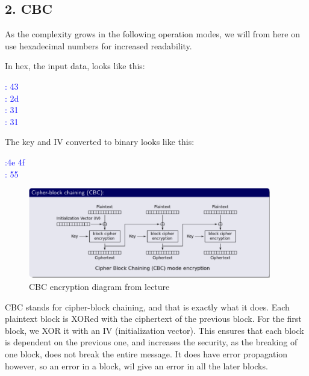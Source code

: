 \documentclass{article}
\begin{document}
\newpage
\subsection{2. CBC}

As the complexity grows in the following operation modes, we will from here on use hexadecimal numbers for increased readability.

In hex, the  input data, looks like this:
\begin{tcolorbox}
\begin{center}
\textcolor{blue}{
: 43\\
: 2d\\
: 31\\
: 31}
\end{center}
\end{tcolorbox}

The key and IV converted to binary looks like this: 
\begin{tcolorbox}
\begin{center}
\textcolor{blue}{
:\qquad4e 4f\\
: 55}
\end{center}
\end{tcolorbox}


\begin{figure}[H]
 \centering
  \includegraphics[width=300pt]{img/cbcLecture.png}
 \caption{CBC encryption diagram from lecture}
 \end{figure}

CBC stands for cipher-block chaining, and that is exactly what it does. Each plaintext block is XORed with the ciphertext of the previous block. For the first block, we XOR it with an IV (initialization vector). This ensures that each block is dependent on the previous one, and increases the security, as the breaking of one block, does not break the entire message. It does have error propagation however, so an error in a block, wil give an error in all the later blocks. 
\end{document}
